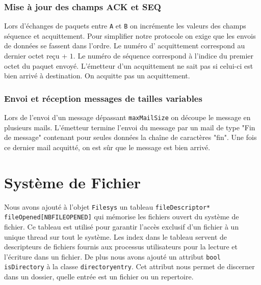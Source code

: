 \documentclass[11pt]{article}
\theoremstyle{definition}
\theoremstyle{definition}
\begin{document}
\subsubsection{Mise à jour des champs ACK et SEQ}
Lors d'échanges de paquets entre \texttt{A} et \texttt{B} on incrémente les valeurs des champs séquence et acquittement. Pour simplifier notre protocole on exige que les envois de données se fassent dans l'ordre. Le numéro d' acquittement correspond au dernier octet reçu + $1$. Le numéro de séquence correspond à l'indice du premier octet du paquet envoyé. L'émetteur d'un acquittement ne sait pas si celui-ci est bien arrivé à destination. On acquitte pas un acquittement. 

\subsubsection{ Envoi et réception messages de tailles variables}
Lors de l'envoi d'un message dépassant \texttt{maxMailSize} on découpe le message en plusieurs mails.
L'émetteur termine l'envoi du message par un mail de type "Fin de message" contenant pour seules données
la chaîne de caractères "fin". Une fois ce dernier mail acquitté, on est sûr que le message est bien arrivé.

\section{Système de Fichier}

Nous avons ajouté à l'objet \texttt{Filesys} un tableau \texttt{fileDescriptor* fileOpened[NBFILEOPENED]} qui mémorise les fichiers ouvert du système de fichier. Ce tableau est utilisé pour garantir l'accès exclusif d'un fichier à un unique thread sur tout le système. Les index dans le tableau servent de descripteurs de fichiers fournis aux processus utilisateurs pour la lecture et l'écriture dans un fichier. 
De plus nous avons ajouté un attribut \texttt{bool isDirectory} à la classe \texttt{directoryentry}. Cet attribut nous permet de discerner dans un dossier, quelle entrée est un fichier ou un repertoire.
\end{document}
